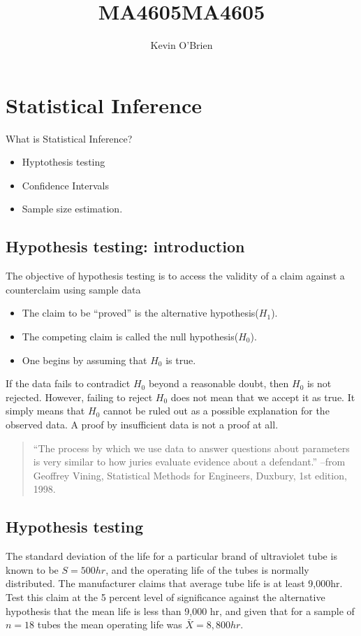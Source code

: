 \documentclass[14pt, a4paper]{article}
\title{MA4605}
\author{ } \date{ }
\theoremstyle{plain}
\theoremstyle{definition}
\theoremstyle{remark}
\begin{document}
\author{Kevin O'Brien}
\title{MA4605}

\tableofcontents \setcounter{tocdepth}{2}


\section{Statistical Inference} What is Statistical Inference?
\begin{itemize}\item Hyptothesis testing \item Confidence
Intervals \item Sample size estimation.\end{itemize}

\subsection{Hypothesis testing: introduction}
The objective of hypothesis testing is to access the validity of a claim against a counterclaim using sample data
\begin{itemize}\item The claim to be “proved” is the alternative hypothesis($H_1$).\item The competing claim is called the null hypothesis($H_0$).\item One begins by assuming that $H_0$ is true. \end{itemize}

If the data fails to contradict $H_0$ beyond a reasonable doubt, then $H_0$ is not rejected. However, failing to reject $H_0$ does not mean that we accept it as true. It simply means that $H_0$ cannot be ruled out as a possible explanation for the observed data. A proof by insufficient data is not a proof at all.

\begin{quote}
“The process by which we use data to answer questions about parameters
is very similar to how juries evaluate evidence about a defendant.” –from
Geoffrey Vining, Statistical Methods for Engineers, Duxbury, 1st edition,
1998.
\end{quote}




\subsection{Hypothesis testing}
The standard deviation of the life for a particular brand of
ultraviolet tube is known to be $S = 500 hr$, and the operating
life of the tubes is normally distributed. The manufacturer claims
that average tube life is at least 9,000hr. Test this claim at the
5 percent level of significance against the alternative hypothesis
that the mean life is less than 9,000 hr, and given that for a
sample of $n = 18$ tubes the mean operating life was $\bar{X}=
8,800 hr.$
\end{document}

